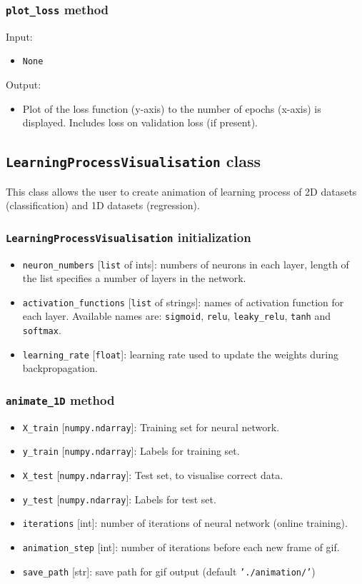 \documentclass[a4]{article}
\begin{document}
\subsubsection{\texttt{plot\_loss} method}
Input:
\begin{itemize}
	\item \texttt{None} 
\end{itemize}
Output:
\begin{itemize}
	\item Plot of the loss function (y-axis) to the number of epochs (x-axis) is displayed. Includes loss on validation loss (if present). 
\end{itemize}


\subsection{\texttt{LearningProcessVisualisation} class}
This class allows the user to create animation of learning process of 2D datasets (classification) and 1D datasets (regression). 

\subsubsection{\texttt{LearningProcessVisualisation} initialization}
\begin{itemize}
    \item \texttt{neuron\_numbers} [\texttt{list} of ints]: numbers of neurons in each layer, length of the list specifies a number of layers in the network.
    \item \texttt{activation\_functions} [\texttt{list} of strings]: names of activation function for each layer. Available names are: \texttt{sigmoid}, \texttt{relu}, \texttt{leaky\_relu}, \texttt{tanh} and \texttt{softmax}.
    \item \texttt{learning\_rate} [\texttt{float}]: learning rate used to update the weights during backpropagation.
\end{itemize}

\subsubsection{\texttt{animate\_1D} method}
\begin{itemize}
    \item \texttt{X\_train} [\texttt{numpy.ndarray}]: Training set for neural network.
    \item \texttt{y\_train} [\texttt{numpy.ndarray}]: Labels for training set.
    \item \texttt{X\_test} [\texttt{numpy.ndarray}]: Test set, to visualise correct data.
    \item \texttt{y\_test} [\texttt{numpy.ndarray}]: Labels for test set.
    \item \texttt{iterations} [int]: number of iterations of neural network (online training).
    \item \texttt{animation\_step} [int]: number of iterations before each new frame of gif. 
    \item \texttt{save\_path} [str]: save path for gif output (default \texttt{'./animation/'})
\end{itemize}
\end{document}
